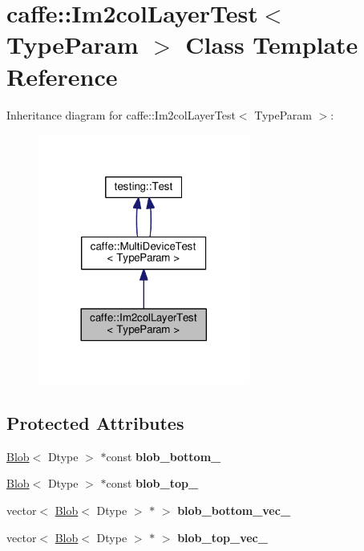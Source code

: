 \hypertarget{classcaffe_1_1_im2col_layer_test}{}\section{caffe\+:\+:Im2col\+Layer\+Test$<$ Type\+Param $>$ Class Template Reference}
\label{classcaffe_1_1_im2col_layer_test}


Inheritance diagram for caffe\+:\+:Im2col\+Layer\+Test$<$ Type\+Param $>$\+:
\nopagebreak
\begin{figure}[H]
\begin{center}
\leavevmode
\includegraphics[width=197pt]{classcaffe_1_1_im2col_layer_test__inherit__graph}
\end{center}
\end{figure}
\subsection*{Protected Attributes}
\begin{DoxyCompactItemize}
\item 
\mbox{\label{classcaffe_1_1_im2col_layer_test_a0e1b1af1bd5d98c395ae80ef1f96afbd}} 
\mbox{\hyperlink{classcaffe_1_1_blob}{Blob}}$<$ Dtype $>$ $\ast$const {\bfseries blob\+\_\+bottom\+\_\+}
\item 
\mbox{\label{classcaffe_1_1_im2col_layer_test_a560d16bfd6aa43aa798245c14a70324c}} 
\mbox{\hyperlink{classcaffe_1_1_blob}{Blob}}$<$ Dtype $>$ $\ast$const {\bfseries blob\+\_\+top\+\_\+}
\item 
\mbox{\label{classcaffe_1_1_im2col_layer_test_a3fa68caa85376b385a5b8be52b2bc201}} 
vector$<$ \mbox{\hyperlink{classcaffe_1_1_blob}{Blob}}$<$ Dtype $>$ $\ast$ $>$ {\bfseries blob\+\_\+bottom\+\_\+vec\+\_\+}
\item 
\mbox{\label{classcaffe_1_1_im2col_layer_test_ad6c07c9ee19cb7404aaece3572e87cb9}} 
vector$<$ \mbox{\hyperlink{classcaffe_1_1_blob}{Blob}}$<$ Dtype $>$ $\ast$ $>$ {\bfseries blob\+\_\+top\+\_\+vec\+\_\+}
\end{DoxyCompactItemize}
